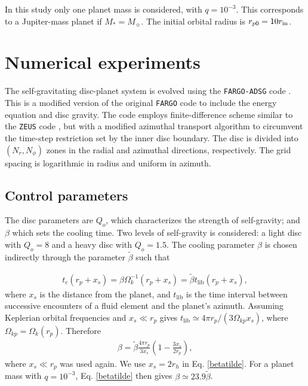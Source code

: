 In this study only one planet mass is considered, with $q=10^{-3}$. This corresponds to a Jupiter-mass
planet if $M_*=M_{\sun}$. The initial orbital radius is $r_{p0} = 10r_\mathrm{in}$. 


\section{Numerical experiments}\label{method}
The self-gravitating disc-planet system is evolved using the 
\texttt{FARGO-ADSG} code \citep{baruteau08, baruteau08b}. This is a modified version 
of the original \texttt{FARGO} code \citep{masset00a} to include the energy 
equation and disc gravity. The code employs finite-difference scheme similar 
to the \texttt{ZEUS} code \citep{stone92}, but with a modified azimuthal transport 
algorithm to circumvent the time-step restriction set by the inner disc boundary. 
The disc is divided into $(N_r,N_\phi)$ zones in the radial and azimuthal directions, 
respectively. The grid spacing is logarithmic in radius and uniform in azimuth.

\subsection{Control parameters}
The disc parameters are $Q_o$, which characterizes the strength of self-gravity; 
and $\beta$ which sets the cooling time. Two levels of self-gravity is considered: 
a light disc with $Q_o=8$ and a heavy disc with $Q_o=1.5$. The cooling 
parameter $\beta$ is chosen indirectly  through the parameter
$\tilde{\beta}$ such that 

\begin{align}
  t_c(r_p+x_s) = \beta\Omega_k^{-1}(r_p+x_s) = \tilde{\beta} t_{\mathrm{lib}}(r_p+x_s), 
\end{align}
where $x_s$ is the distance from the planet, and $t_\mathrm{lib}$ is
the time interval between successive encounters of a fluid element and
the planet's azimuth. Assuming Keplerian orbital frequencies and $x_s\ll r_p$
gives $t_\mathrm{lib}\simeq 4\pi r_p/(3\Omega_{kp} x_s)$, where
$\Omega_{kp} = \Omega_k(r_p)$. Therefore   
\begin{align}\label{betatilde}
  \beta = \tilde{\beta} \frac{4\pi r_p}{3x_s} \left(1  - \frac{3x_s}{2r_p}\right), 
\end{align}
where $x_s\ll r_p$ was used again. We use $x_s = 2r_h$ in
Eq. \ref{betatilde}. For a planet mass with $q=10^{-3}$,
Eq. \ref{betatilde} then gives $\beta \simeq 23.9\tilde{\beta}$. 


